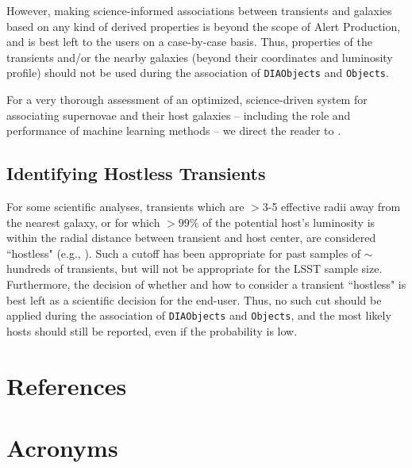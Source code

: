 \documentclass[DM,authoryear,toc]{lsstdoc}
\begin{document}
However, making science-informed associations between transients and galaxies based on any kind of derived properties is beyond the scope of Alert Production, and is best left to the users on a case-by-case basis. 
Thus, properties of the transients and/or the nearby galaxies (beyond their coordinates and luminosity profile) should not be used during the association of {\tt DIAObjects} and {\tt Objects}.

For a very thorough assessment of an optimized, science-driven system for associating supernovae and their host galaxies -- including the role and performance of machine learning methods -- we direct the reader to \citet{2016AJ....152..154G}.


\subsection{Identifying Hostless Transients}\label{ssec:options_hostless}

For some scientific analyses, transients which are $>$3-5 effective radii away from the nearest galaxy, or for which $>99\%$ of the potential host's luminosity is within the radial distance between transient and host center, are considered ``hostless" (e.g., \citealt{2011ApJ...729..142S}).
Such a cutoff has been appropriate for past samples of $\sim$hundreds of transients, but will not be appropriate for the LSST sample size.
Furthermore, the decision of whether and how to consider a transient ``hostless" is best left as a scientific decision for the end-user.
Thus, no such cut should be applied during the association of {\tt DIAObjects} and {\tt Objects}, and the most likely hosts should still be reported, even if the probability is low.


\clearpage

\clearpage


\clearpage

\appendix
\section{References} \label{sec:bib}


\section{Acronyms} \label{sec:acronyms}

\end{document}
